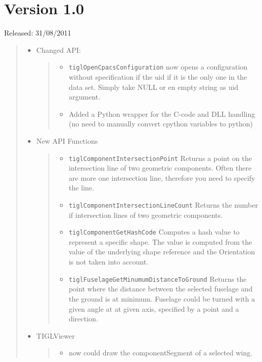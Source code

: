 \documentclass[]{scrartcl}
\begin{document}
\section{Version 1.0}

Released: 31/08/2011

\begin{quote}
\begin{itemize}
\item
  Changed API:

  \begin{quote}
  \begin{itemize}
  \itemsep1pt\parskip0pt
  \item
    \texttt{tiglOpenCpacsConfiguration} now opens a configuration
    without specification if the uid if it is the only one in the data
    set. Simply take NULL or en empty string as uid argument.
  \item
    Added a Python wrapper for the C-code and DLL handling (no need to
    manually convert cpython variables to python)
  \end{itemize}
  \end{quote}
\item
  New API Functions

  \begin{quote}
  \begin{itemize}
  \itemsep1pt\parskip0pt
  \item
    \texttt{tiglComponentIntersectionPoint} Returns a point on the
    intersection line of two geometric components. Often there are more
    one intersection line, therefore you need to specify the line.
  \item
    \texttt{tiglComponentIntersectionLineCount} Returns the number if
    intersection lines of two geometric components.
  \item
    \texttt{tiglComponentGetHashCode} Computes a hash value to represent
    a specific shape. The value is computed from the value of the
    underlying shape reference and the Orientation is not taken into
    account.
  \item
    \texttt{tiglFuselageGetMinumumDistanceToGround} Returns the point
    where the distance between the selected fuselage and the ground is
    at minimum. Fuselage could be turned with a given angle at at given
    axis, specified by a point and a direction.
  \end{itemize}
  \end{quote}
\item
  TIGLViewer

  \begin{quote}
  \begin{itemize}
  \itemsep1pt\parskip0pt
  \item
    now could draw the componentSegment of a selected wing.
  \end{itemize}
  \end{quote}
\end{itemize}
\end{quote}
\end{document}
